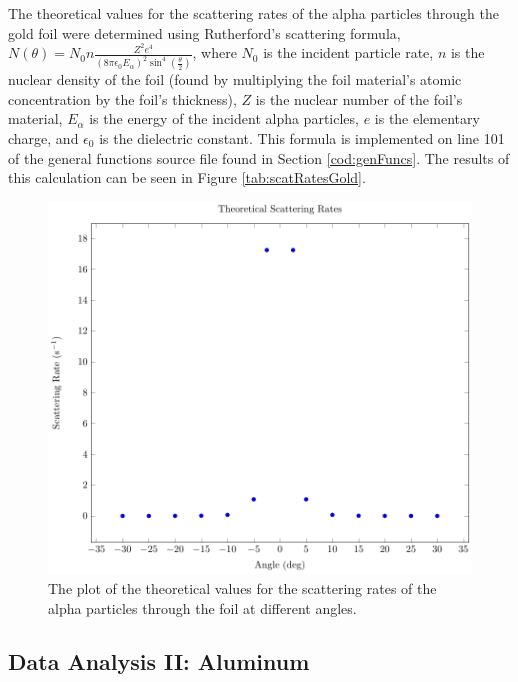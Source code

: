 \documentclass[a4paper]{article}
\begin{document}
\qq The theoretical values for the scattering rates of the alpha particles
through the gold foil were determined using Rutherford's scattering formula, \(
N (\theta) = N_0 n \frac{Z^2 e^4}{(8 \pi \epsilon_0 E_{\alpha})^2 \sin^4
  \left( \frac{\theta}{2} \right)} \), where \( N_0 \) is the incident particle
rate, \( n \) is the nuclear density of the foil (found by multiplying the
foil material's atomic concentration by the foil's thickness), \( Z \) is the
nuclear number of the foil's material, \( E_{\alpha} \) is the energy of the
incident alpha particles, \( e \) is the elementary charge, and \( \epsilon_0 \)
is the dielectric constant. This formula is implemented on line 101 of the
general functions source file found in Section \ref{cod:genFuncs}. The results
of this calculation can be seen in Figure \ref{tab:scatRatesGold}.

\begin{figure}[H]
  \begin{center}
    \includegraphics[scale=0.8]{Plots/TheoreticalScatteringRates/theoScatRates.pdf}
  \end{center}
  \caption{The plot of the theoretical values for the scattering rates of the
    alpha particles through the foil at different angles.}
  \label{gph:theoScatRatesGold}
\end{figure}

\subsection{Data Analysis II: Aluminum}
\end{document}
